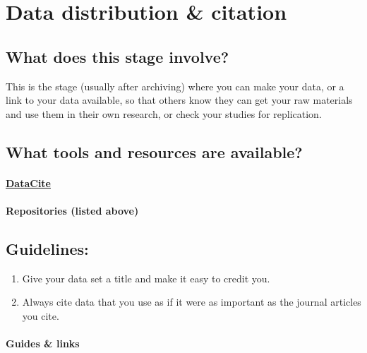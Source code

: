 \documentclass[]{article}
\begin{document}
\section{Data distribution \&
citation}\label{data-distribution-citation}

\subsection{What does this stage
involve?}\label{what-does-this-stage-involve-1}

This is the stage (usually after archiving) where you can make your
data, or a link to your data available, so that others know they can get
your raw materials and use them in their own research, or check your
studies for replication.

\subsection{What tools and resources are
available?}\label{what-tools-and-resources-are-available-3}

\paragraph{\href{https://www.datacite.org/}{DataCite}}\label{datacite}

\paragraph{Repositories (listed above)}\label{repositories-listed-above}

\subsection{Guidelines:}\label{guidelines-3}

\begin{enumerate}
\def\labelenumi{\arabic{enumi}.}
\itemsep1pt\parskip0pt
\item
  Give your data set a title and make it easy to credit you.
\item
  Always cite data that you use as if it were as important as the
  journal articles you cite.
\end{enumerate}

\paragraph{Guides \& links}\label{guides-links}
\end{document}
